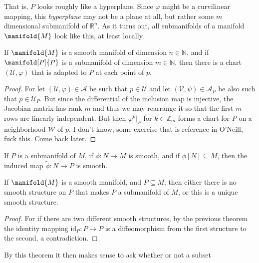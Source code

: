         That is, $P$ looks roughly like a hyperplane. Since $\varphi$ might
        be a curvilinear mapping, this \textit{hyperplane} may not be a
        plane at all, but rather some $m$ dimensional submanifold of
        $\mathbb{R}^{n}$. As it turns out, all submanifolds of a manifold
        $\manifold{M}$ look like this, at least locally.
        \begin{theorem}
            If $\manifold{M}$ is a smooth manifold of dimension
            $n\in\mathbb{N}$, and if $\manifold[P]{P}$ is a submanifold of
            dimension $m\in\mathbb{N}$, then there is a chart
            $(\mathcal{U},\varphi)$ that is adapted to $P$ at each point of
            $p$.
        \end{theorem}
        \begin{proof}
            For let $(\mathcal{U},\varphi)\in\mathcal{A}$ be such that
            $p\in\mathcal{U}$ and let $(\mathcal{V},\psi)\in\mathcal{A}_{P}$
            be also such that $p\in\mathcal{U}_{P}$. But since the
            differential of the inclusion map is injective, the Jacobian
            matrix has rank $m$ and thus we may rearrange it so that the
            first $m$ rows are linearly independent. But then
            $\varphi^{k}|_{P}$ for $k\in\mathbb{Z}_{m}$ forms a chart for
            $P$ on a neighborhood $\mathcal{W}$ of $p$. I don't know, some
            exercise that is reference in O'Neill, fuck this. Come back
            later.
        \end{proof}
        \begin{theorem}
            If $P$ is a submanifold of $M$, if $\phi:N\rightarrow{M}$ is
            smooth, and if $\phi[N]\subseteq{M}$, then the induced map
            $\tilde{\phi}:N\rightarrow{P}$ is smooth.
        \end{theorem}
        \begin{theorem}
            If $\manifold{M}$ is a smooth manifold, and $P\subseteq{M}$,
            then either there is no smooth structure on $P$ that makes $P$
            a submanifold of $M$, or this is a unique smooth structure.
        \end{theorem}
        \begin{proof}
            For if there are two different smooth structures, by the
            previous theorem the identity mapping
            $\textrm{id}_{P}:P\rightarrow{P}$ is a diffeomorphism from the
            first structure to the second, a contradiction.
        \end{proof}
        By this theorem it then makes sense to ask whether or not a subset
